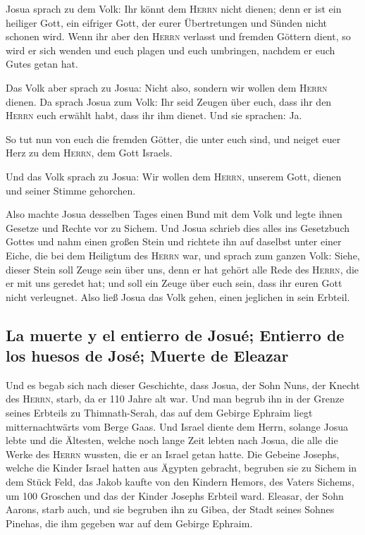 Josua sprach zu dem Volk: Ihr könnt dem \textsc{Herrn}
nicht dienen; denn er ist ein heiliger Gott, ein eifriger Gott, der
eurer Übertretungen und Sünden nicht schonen wird.  Wenn
ihr aber den \textsc{Herrn} verlasst und fremden Göttern dient, so wird
er sich wenden und euch plagen und euch umbringen, nachdem er euch Gutes
getan hat.

 Das Volk aber sprach zu Josua: Nicht also, sondern wir
wollen dem \textsc{Herrn} dienen.  Da sprach Josua zum
Volk: Ihr seid Zeugen über euch, dass ihr den \textsc{Herrn} euch
erwählt habt, dass ihr ihm dienet. Und sie sprachen: Ja.

 So tut nun von euch die fremden Götter, die unter euch
sind, und neiget euer Herz zu dem \textsc{Herrn}, dem Gott Israels.

 Und das Volk sprach zu Josua: Wir wollen dem
\textsc{Herrn}, unserem Gott, dienen und seiner Stimme gehorchen.

 Also machte Josua desselben Tages einen Bund mit dem
Volk und legte ihnen Gesetze und Rechte vor zu Sichem. 
Und Josua schrieb dies alles ins Gesetzbuch Gottes und nahm einen großen
Stein und richtete ihn auf daselbst unter einer Eiche, die bei dem
Heiligtum des \textsc{Herrn} war,  und sprach zum ganzen
Volk: Siehe, dieser Stein soll Zeuge sein über uns, denn er hat gehört
alle Rede des \textsc{Herrn}, die er mit uns geredet hat; und soll ein
Zeuge über euch sein, dass ihr euren Gott nicht verleugnet.
 Also ließ Josua das Volk gehen, einen jeglichen in sein
Erbteil.

\hypertarget{la-muerte-y-el-entierro-de-josuuxe9-entierro-de-los-huesos-de-josuxe9-muerte-de-eleazar}{%
\subsection{La muerte y el entierro de Josué; Entierro de los huesos de
José; Muerte de
Eleazar}\label{la-muerte-y-el-entierro-de-josuuxe9-entierro-de-los-huesos-de-josuxe9-muerte-de-eleazar}}

 Und es begab sich nach dieser Geschichte, dass Josua,
der Sohn Nuns, der Knecht des \textsc{Herrn}, starb, da er 110 Jahre alt
war.  Und man begrub ihn in der Grenze seines Erbteils zu
Thimnath-Serah, das auf dem Gebirge Ephraim liegt mitternachtwärts vom
Berge Gaas.  Und Israel diente dem Herrn, solange Josua
lebte und die Ältesten, welche noch lange Zeit lebten nach Josua, die
alle die Werke des \textsc{Herrn} wussten, die er an Israel getan hatte.
 Die Gebeine Josephs, welche die Kinder Israel hatten aus
Ägypten gebracht, begruben sie zu Sichem in dem Stück Feld, das Jakob
kaufte von den Kindern Hemors, des Vaters Sichems, um 100 Groschen und
das der Kinder Josephs Erbteil ward.  Eleasar, der Sohn
Aarons, starb auch, und sie begruben ihn zu Gibea, der Stadt seines
Sohnes Pinehas, die ihm gegeben war auf dem Gebirge Ephraim.
